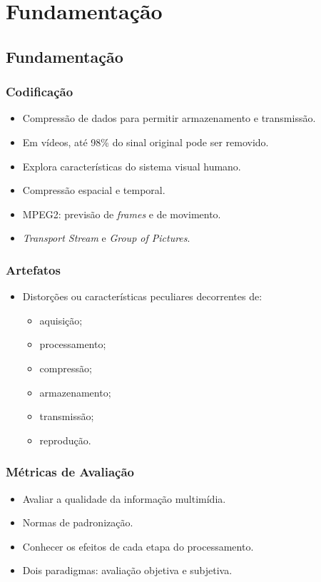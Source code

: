 \section{Fundamentação}

% 
\subsection{Fundamentação}
    \begin{frame}\frametitle{Codificação}
        \begin{itemize}
            \item Compressão de dados para permitir armazenamento e transmissão.
            \item Em vídeos, até 98\% do sinal original pode ser removido. %
            \item Explora características do sistema visual humano.
            \item Compressão espacial e temporal.
            \item MPEG2: previsão de \emph{frames} e de movimento.
            \item \emph{Transport Stream} e \emph{Group of Pictures}.
        \end{itemize}
    \end{frame}

    \begin{frame}\frametitle{Artefatos}
        \begin{itemize}
            \item Distorções ou características peculiares decorrentes de:
            \begin{itemize}
                \item aquisição;
                \item processamento;
                \item compressão;
                \item armazenamento;
                \item transmissão;
                \item reprodução.
            \end{itemize}
        \end{itemize}
    \end{frame}

    \begin{frame}\frametitle{Métricas de Avaliação}
        \begin{itemize}
            \item Avaliar a qualidade da informação multimídia.
            \item Normas de padronização.
            \item Conhecer os efeitos de cada etapa do processamento.
            \item Dois paradigmas: avaliação objetiva e subjetiva.
        \end{itemize}
    \end{frame}
    
